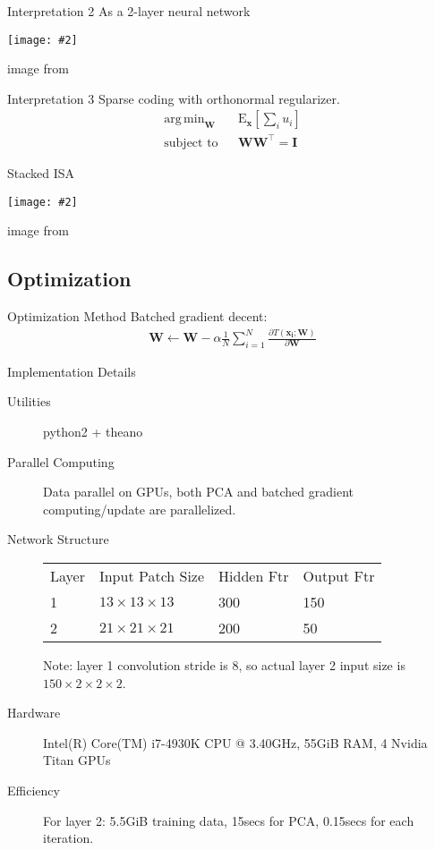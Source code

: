 \documentclass {beamer}
\DeclareMathOperator*{\argmin}{arg\,min}
\newcommand{\trans}[1]{#1^\intercal}
\renewcommand{\vec}[1]{\boldsymbol{#1}}
\newcommand{\addgraph}[2]{\begin{center}
\texttt{[image: \#2]}\end{center}}
\begin{document}
\begin{frame}{Interpretation 2}
    As a 2-layer neural network
    \addgraph{0.8}{res/isa.png}
    {\tiny image from \cite{le2011learning}}
\end{frame}

\begin{frame}{Interpretation 3}
    Sparse coding with orthonormal regularizer.
    \begin{eqnarray*}
        \argmin_{\vec{W}} && \text{E}_{\vec{x}}\left[\sum_i u_i\right] \\
        \text{subject to} && \vec{W}\trans{\vec{W}} = \vec{I}
    \end{eqnarray*}
\end{frame}

\begin{frame}{Stacked ISA}
    \addgraph{0.6}{res/isa-stack.png}
    {\tiny image from \cite{wu2013unsupervised}}
\end{frame}

\subsection{Optimization}
\begin{frame}{Optimization Method}
    Batched gradient decent:
    \begin{eqnarray*}
        \vec{W} \leftarrow \vec{W} - \alpha
        \frac{1}{N}\sum_{i=1}^N \frac{\partial{T(\vec{x_i};\vec{W})}}
            {\partial{\vec{W}}}
    \end{eqnarray*}
\end{frame}

\begin{frame}{Implementation Details}
    \begin{description}
        \item[Utilities] python2 + theano
        \item[Parallel Computing] Data parallel on GPUs, both PCA and batched
            gradient computing/update are parallelized.
        \item[Network Structure]
            \begin{tabular}{llll}
                Layer & Input Patch Size & Hidden Ftr & Output Ftr \\
                1 & $13\times13\times13$ & 300 & 150 \\
                2 & $21\times21\times21$ & 200 & 50
            \end{tabular}
            Note: layer 1 convolution stride is 8, so actual layer 2 input size
            is $150 \times 2 \times 2 \times 2$.
        \item[Hardware]
            Intel(R) Core(TM) i7-4930K CPU @ 3.40GHz,
            55GiB RAM, 4 Nvidia Titan GPUs
        \item[Efficiency] For layer 2: 5.5GiB training data, 15secs for PCA,
            0.15secs for each iteration.
    \end{description}
\end{frame}
\end{document}
